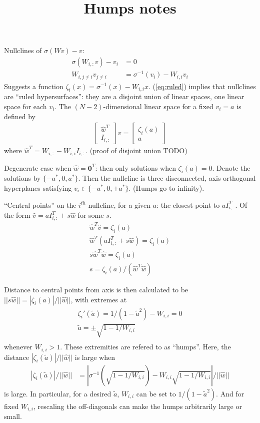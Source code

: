 \documentclass[pdftex,12pt,letterpaper]{article}
\begin{document}
\title{Humps notes}
\date{}
\maketitle

Nullclines of $\sigma(Wv)-v$:
\begin{align}
\sigma(W_{i,:}v) - v_i &= 0 \\
W_{i,j\ne i}v_{j\ne i} &= \sigma^{-1}(v_i) - W_{i,i}v_i\label{eq:ruled}
\end{align}
Suggests a function $\zeta_i(x) = \sigma^{-1}(x) - W_{i,i}x$.  (\ref{eq:ruled}) implies that nullclines are ``ruled hypersurfaces'': they are a disjoint union of linear spaces, one linear space for each $v_i$.  The $(N-2)$-dimensional linear space for a fixed $v_i = a$ is defined by
\begin{align}
\left[\begin{array}{c} \hat{w}^T \\ I_{i,:}\end{array}\right]v = \left[\begin{array}{c} \zeta_i(a) \\ a\end{array}\right]
\end{align}
where $\hat{w}^T = W_{i,:} - W_{i,i}I_{i,:}$. (proof of disjoint union TODO)

Degenerate case when $\hat{w} = \mathbf{0}^T$:  then only solutions when $\zeta_i(a) = 0$.  Denote the solutions by $\{-a^*, 0, a^*\}$.  Then the nullcline is three disconnected, axis orthogonal hyperplanes satisfying $v_i \in \{-a^*, 0, +a^*\}$. (Humps go to infinity).

``Central points'' on the $i^{th}$ nullcline, for a given $a$: the closest point to $aI_{i,:}^T$.  Of the form $\hat{v} = aI_{i,:}^T + s\hat{w}$ for some $s$.
\begin{align}
\hat{w}^T\hat{v} = \zeta_i(a) \\
\hat{w}^T(aI_{i,:}^T + s\hat{w}) = \zeta_i(a) \\
s\hat{w}^T\hat{w} = \zeta_i(a) \\
s = \zeta_i(a) / (\hat{w}^T\hat{w})
\end{align}

Distance to central points from axis is then calculated to be $|| s\hat{w} || = |\zeta_i(a)| / ||\hat{w}||$, with extremes at
\begin{align}
\zeta_i'(\tilde{a}) = 1 / (1 - \tilde{a}^2) - W_{i,i} = 0 \\
\tilde{a} = \pm \sqrt{1 - 1/W_{i,i}} \\
\end{align}
whenever $W_{i,i} > 1$.  These extremities are refered to as ``humps''.  Here, the distance $|\zeta_i(\tilde{a})| / ||\hat{w}||$ is large when
\begin{align}
|\zeta_i(\tilde{a})|/||\hat{w}||
&= |\sigma^{-1}(\sqrt{1 - 1/W_{i,i}}) - W_{i,i}\sqrt{1 - 1/W_{i,i}}|/||\hat{w}||
\end{align}
is large.  In particular, for a desired $\tilde{a}$, $W_{i,i}$ can be set to $1 / (1 - \tilde{a}^2)$.  And for fixed $W_{i,i}$, rescaling the off-diagonals can make the humps arbitrarily large or small.
\end{document}
